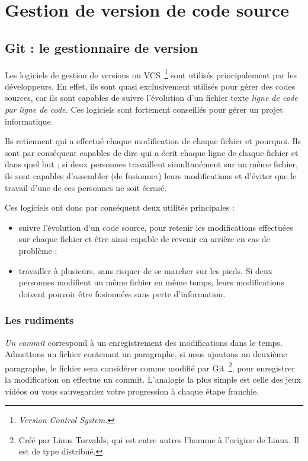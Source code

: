 \chapter{Gestion de version de code source}

\section{Git : le gestionnaire de version}

Les logiciels de gestion de versions ou VCS\, \footnote{\emph{Version Control
System.}} sont utilisés principalement par les développeurs. En effet, ils sont
quasi exclusivement utilisés pour gérer des codes sources, car ils sont
capables de suivre l’évolution d’un fichier texte \emph{ligne de code par ligne de
code.} Ces logiciels sont fortement conseillés pour gérer un projet
informatique.

Ils retiennent qui a effectué chaque modification de chaque fichier et
pourquoi. Ils sont par conséquent capables de dire qui a écrit chaque ligne de
chaque fichier et dans quel but ; si deux personnes travaillent simultanément
sur un même fichier, ils sont capables d’assembler (de fusionner) leurs
modifications et d’éviter que le travail d’une de ces personnes ne soit écrasé.

Ces logiciels ont donc par conséquent deux utilités principales :
\begin{itemize}
    \item suivre l’évolution d’un code source, pour retenir les modifications
effectuées sur chaque fichier et être ainsi capable de revenir en arrière en
cas de problème ;
    \item travailler à plusieurs, sans risquer de se marcher sur les pieds.
Si deux personnes modifient un même fichier en même temps, leurs modifications
doivent pouvoir être fusionnées sans perte d’information.
\end{itemize}

\subsection{Les rudiments}

\emph{Un commit} correspond à un enregistrement des modifications dans le
temps.  Admettons un fichier contenant un paragraphe, si nous ajoutons un
deuxième paragraphe, le fichier sera considérer comme modifié par Git\,
\footnote{Créé par Linus Torvalds, qui est entre autres l’homme à l’origine de
Linux. Il est de type distribué.}, pour enregistrer la modification on effectue
un commit.  L'analogie la plus simple est celle des jeux vidéos ou vous
sauvegardez votre progression à chaque étape franchie.

